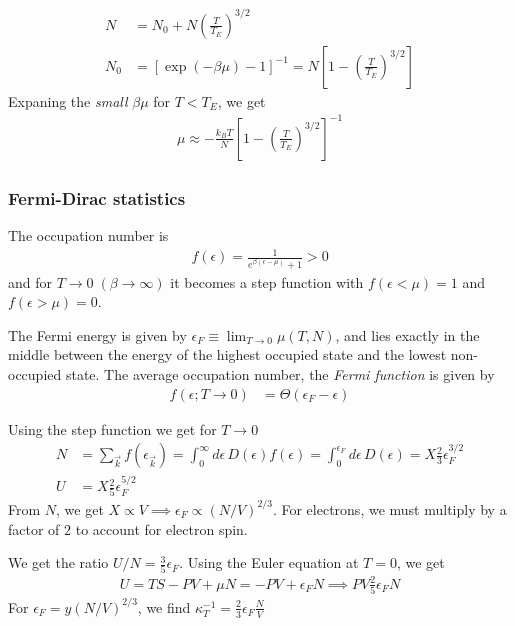 \documentclass[a4paper, english, 12pt]{article}
\newcommand{\eps}{\epsilon}
\newcommand{\closed}[1]{\left( #1 \right)}
\newcommand{\bracket}[1]{\left[ #1 \right]}
\begin{document}
\begin{multicols*}{2}
\begin{align*}
    N &= N_0 + N \left(\frac{T}{T_E}\right)^{3/2} \\ 
    N_0 &= [\exp(-\beta\mu)-1]^{-1} = N\bracket{1-\closed{\frac{T}{T_E}}^{3/2} }
\end{align*}
Expaning the \textit{small} $\beta \mu$ for $T<T_E$, we get 
\begin{align*}
    \mu \approx -\frac{k_B T}{N}\bracket{1-\closed{\frac{T}{T_E}}^{3/2}}^{-1}
\end{align*}


\subsubsection*{Fermi-Dirac statistics}
The occupation number is 
\begin{align*}
    f(\eps)=\frac{1}{e^{\beta(\eps-\mu)} +1} > 0
\end{align*}
and for $T\to0\; (\beta\to\infty)$ it becomes a step function with $f(\eps<\mu)=1$ and $f(\eps>\mu)=0$. 

The Fermi energy is given by $\eps_F \equiv \lim_{T\to0} \mu(T,N)$, and lies exactly in the middle between the energy of the highest occupied state and the lowest non-occupied state. The average occupation number, the \textit{Fermi function} is given by 
\begin{align*}
    f(\eps; T\to0) &= \Theta(\eps_F-\eps)
\end{align*}

Using the step function we get for $T\to0$ 
\begin{align*}
    N&=\sum_{\vec{k}} f(\eps_{\vec{k}}) = \int_0^\infty d\eps\, D(\eps)f(\eps) = \int_0^{\eps_F} d\eps\, D(\eps) = X \frac{2}{3} \eps_F^{3/2} \\ 
    U&=X \frac{2}{5} \eps_F^{5/2}
\end{align*}
From $N$, we get $X\propto V\implies \eps_F \propto(N/V)^{2/3}$. For electrons, we must multiply by a factor of $2$ to account for electron spin. 

We get the ratio $U/N=\frac{3}{5}\eps_F$. Using the Euler equation at $T=0$, we get 
\begin{align*}
    U=TS-PV+\mu N = -PV+\eps_F N \implies PV \frac{2}{5}\eps_F N 
\end{align*}
For $\eps_F=y(N/V)^{2/3}$, we find $\kappa_T^{-1}=\frac{2}{3}\eps_F \frac{N}{V}$




\end{multicols*}
\end{document}
